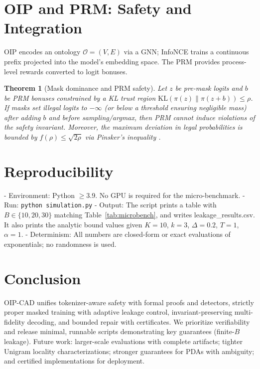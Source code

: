 \documentclass{article}
\newtheorem{theorem}{Theorem}
\begin{document}
\section{OIP and PRM: Safety and Integration}
OIP encodes an ontology $\mathcal{O}=(V,E)$ via a GNN; InfoNCE trains a continuous prefix projected into the model’s embedding space. The PRM provides process-level rewards converted to logit bonuses.

\begin{theorem}[Mask dominance and PRM safety]\label{thm:prm}
Let $z$ be pre-mask logits and $b$ be PRM bonuses constrained by a KL trust region $\mathrm{KL}(\pi(z)\|\pi(z+b))\le \rho$. If masks set illegal logits to $-\infty$ (or below a threshold ensuring negligible mass) after adding $b$ and before sampling/argmax, then PRM cannot induce violations of the safety invariant. Moreover, the maximum deviation in legal probabilities is bounded by $f(\rho)\le\sqrt{2\rho}$ via Pinsker’s inequality \cite{csiszar2011it}.
\end{theorem}

\section{Reproducibility}\label{sec:repro}
- Environment: Python $\ge$3.9. No GPU is required for the micro-benchmark.
- Run: \texttt{python simulation.py}
- Output: The script prints a table with $B\in\{10,20,30\}$ matching Table~\ref{tab:microbench}, and writes leakage\_results.csv. It also prints the analytic bound values given $K=10$, $k=3$, $\Delta=0.2$, $T=1$, $\alpha=1$.
- Determinism: All numbers are closed-form or exact evaluations of exponentials; no randomness is used.

\section{Conclusion}
OIP-CAD unifies tokenizer-aware safety with formal proofs and detectors, strictly proper masked training with adaptive leakage control, invariant-preserving multi-fidelity decoding, and bounded repair with certificates. We prioritize verifiability and release minimal, runnable scripts demonstrating key guarantees (finite-$B$ leakage). Future work: larger-scale evaluations with complete artifacts; tighter Unigram locality characterizations; stronger guarantees for PDAs with ambiguity; and certified implementations for deployment.
\end{document}
